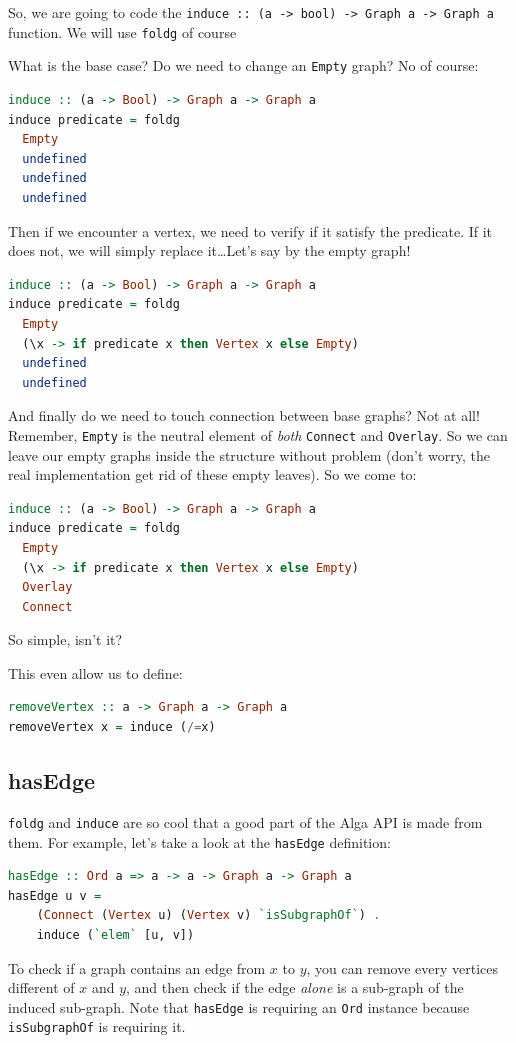 \documentclass[10pt,a4paper]{article}
\begin{document}
So, we are going to code the \verb|induce :: (a -> bool) -> Graph a -> Graph a| function. We will use \verb|foldg| of course

What is the base case? Do we need to change an \verb|Empty| graph? No of course:

\begin{lstlisting}[language=Haskell, frame=single]
induce :: (a -> Bool) -> Graph a -> Graph a
induce predicate = foldg
  Empty 
  undefined
  undefined
  undefined
\end{lstlisting}

Then if we encounter a vertex, we need to verify if it satisfy the predicate. If it does not, we will simply replace it\ldots  Let's say by the empty graph!

\begin{lstlisting}[language=Haskell, frame=single]
induce :: (a -> Bool) -> Graph a -> Graph a
induce predicate = foldg 
  Empty
  (\x -> if predicate x then Vertex x else Empty)
  undefined
  undefined
\end{lstlisting}
 
And finally do we need to touch connection between base graphs? Not at all! Remember, \verb|Empty| is the neutral element of \emph{both} \verb|Connect| and \verb|Overlay|. So we can leave our empty graphs inside the structure without problem (don't worry, the real implementation get rid of these empty leaves). So we come to:

\begin{lstlisting}[language=Haskell, frame=single]
induce :: (a -> Bool) -> Graph a -> Graph a
induce predicate = foldg 
  Empty 
  (\x -> if predicate x then Vertex x else Empty)
  Overlay
  Connect
\end{lstlisting}

So simple, isn't it?
 
This even allow us to define:

\begin{lstlisting}[language=Haskell, frame=single]
removeVertex :: a -> Graph a -> Graph a
removeVertex x = induce (/=x)
\end{lstlisting}

\subsection{hasEdge}
\verb|foldg| and \verb|induce| are so cool that a good part of the Alga API is made from them. For example, let's take a look at the \verb|hasEdge| definition:
\begin{lstlisting}[language=Haskell, frame=single]
hasEdge :: Ord a => a -> a -> Graph a -> Graph a
hasEdge u v = 
	(Connect (Vertex u) (Vertex v) `isSubgraphOf`) . 
	induce (`elem` [u, v])
\end{lstlisting}
To check if a graph contains an edge from $x$ to $y$, you can remove every vertices different of $x$ and $y$, and then check if the edge \emph{alone} is a sub-graph of the induced sub-graph.
Note that \verb|hasEdge| is requiring an \verb|Ord| instance because \verb|isSubgraphOf| is requiring it.
\end{document}
